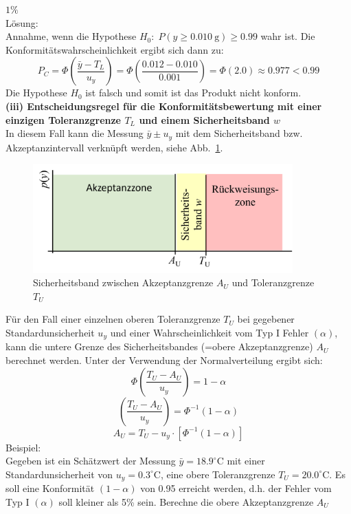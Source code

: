 $1\%$ \\
Lösung:\\
Annahme, wenn die Hypothese 
$H_0: \; P(y \ge 0.010~\mathrm{g}) \ge 0.99$  wahr ist. \newline
Die Konformitätswahrscheinlichkeit ergibt sich dann zu: 
\[P_C = \Phi \left(\frac{\bar y-T_L}{u_y}\right) = \Phi \left(\frac{0.012-0.010}{0.001}\right) = 
 \Phi(2.0) \approx 0.977 < 0.99 
\]
Die Hypothese $H_0$ ist falsch und somit ist das Produkt nicht konform. \\
\textbf{(iii) Entscheidungsregel für die Konformitätsbewertung mit einer einzigen  Toleranzgrenze $T_L$ und einem Sicherheitsband $w$} \\
In diesem Fall kann die Messung $\bar y \pm u_y$ mit dem Sicherheitsband bzw. Akzeptanzintervall verknüpft werden, siehe Abb.~\ref{fig:Sicherheitsband_Entscheidungsregel_oebere_Toleranz}. \\
 \begin{figure}[!htb]
 	\begin{center}
 		\includegraphics[width=100mm]{06_vorlesung/media/Toleranzband_Sicherheitsband.png}
 		\caption{Sicherheitsband zwischen Akzeptanzgrenze $A_U$ und Toleranzgrenze $T_U$}
 		\label{fig:Sicherheitsband_Entscheidungsregel_oebere_Toleranz}
 	\end{center}
 \end{figure}
Für den Fall einer einzelnen oberen Toleranzgrenze $T_U$ bei gegebener Standardunsicherheit $u_y$ und einer Wahrscheinlichkeit vom Typ I Fehler $(\alpha)$, kann die untere Grenze des Sicherheitsbandes (=obere Akzeptanzgrenze) $A_U$ berechnet werden. Unter der Verwendung der Normalverteilung ergibt sich: \\
\[
\Phi\left(\frac{T_U-A_U}{u_y}\right) = 1-\alpha
\]
\[
\left(\frac{T_U-A_U}{u_y}\right) = \Phi^{-1}(1-\alpha)
\]
\[
A_U = T_U - u_y \cdot [\Phi^{-1}(1-\alpha)]
\]
Beispiel: \\
Gegeben ist ein Schätzwert der Messung $\bar y=18.9^{\circ}\mathrm{C}$ mit einer Standardunsicherheit von $u_y=0.3^{\circ}\mathrm{C}$, eine obere Toleranzgrenze $T_U = 20.0^{\circ}\mathrm{C}$. Es soll eine Konformität $(1-\alpha)$ von 0.95 erreicht werden, d.h. der Fehler vom Typ I $(\alpha)$ soll kleiner als 5\% sein. Berechne die obere Akzeptanzgrenze $A_U$ \\
